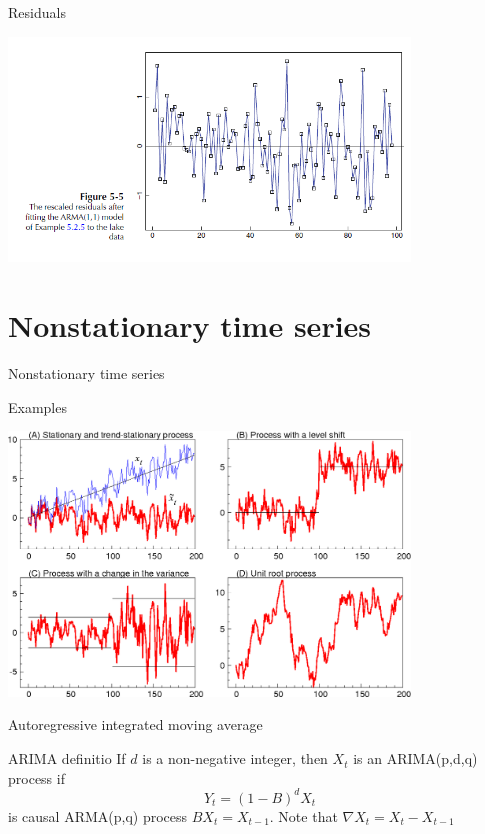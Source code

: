 \documentclass[11pt]{beamer}
\begin{document}
\begin{frame}{Residuals \cite{brockwell2002introduction}}
    \begin{center}
     \includegraphics[width=0.8\textwidth]{Pic/Residuals.png}
    \end{center}
\end{frame}

\section{Nonstationary time series}
\begin{frame}
\begin{center}
\Huge
Nonstationary time series
\end{center}
\end{frame}

\begin{frame}{Examples \cite{brockwell2002introduction,ur}}
    \begin{center}
     \includegraphics[width=0.8\textwidth]{Pic/unit_root_ts.png}
    \end{center}
\end{frame}

\begin{frame}{Autoregressive integrated moving average \cite{brockwell2002introduction}}
\begin{alertblock}{ARIMA definitio}
If $d$ is a non-negative integer, then ${X_{t}}$ is an ARIMA(p,d,q) process if 
\begin{equation*}
Y_{t}=(1-B)^{d}X_{t}
\end{equation*}
is causal ARMA(p,q) process $BX_{t}=X_{t-1}$. Note that $\nabla X_{t}=X_{t}-X_{t-1}$
\end{alertblock}
\end{frame}
\end{document}
